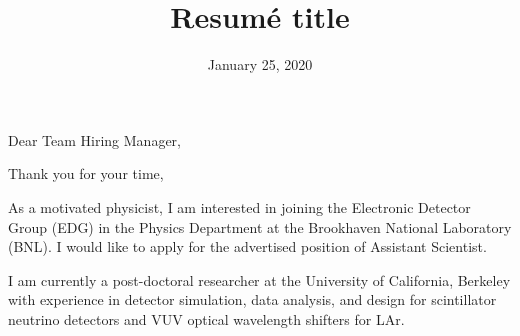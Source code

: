 \documentclass[11pt]{moderncv}        %
\title{Resumé title}                               %
\begin{document}
\date{January 25, 2020}
\opening{Dear Team Hiring Manager,}
\closing{Thank you for your time,}
\makelettertitle

\justifying
As a motivated physicist, I am interested in joining the Electronic Detector
Group (EDG) in the Physics Department at the Brookhaven National Laboratory
(BNL).
I would like to apply for the advertised position of Assistant Scientist.

I am currently a post-doctoral researcher at the University of California,
Berkeley with experience in detector simulation, data analysis, and design for
scintillator neutrino detectors and VUV optical wavelength shifters for LAr.
\end{document}
